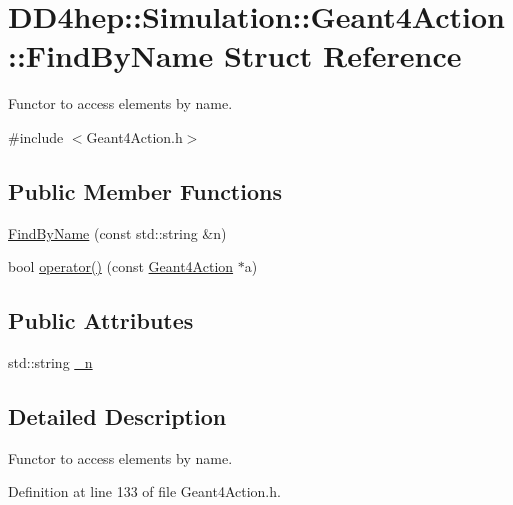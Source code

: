 \hypertarget{struct_d_d4hep_1_1_simulation_1_1_geant4_action_1_1_find_by_name}{
\section{DD4hep::Simulation::Geant4Action::FindByName Struct Reference}
\label{struct_d_d4hep_1_1_simulation_1_1_geant4_action_1_1_find_by_name}
}


Functor to access elements by name.  


{\ttfamily \#include $<$Geant4Action.h$>$}\subsection*{Public Member Functions}
\begin{DoxyCompactItemize}
\item 
\hyperlink{struct_d_d4hep_1_1_simulation_1_1_geant4_action_1_1_find_by_name_a731d979b2f54aaeb1f99d6c3723681d0}{FindByName} (const std::string \&n)
\item 
bool \hyperlink{struct_d_d4hep_1_1_simulation_1_1_geant4_action_1_1_find_by_name_add22afec2f12ebc3ead57df3694de5e5}{operator()} (const \hyperlink{class_d_d4hep_1_1_simulation_1_1_geant4_action}{Geant4Action} $\ast$a)
\end{DoxyCompactItemize}
\subsection*{Public Attributes}
\begin{DoxyCompactItemize}
\item 
std::string \hyperlink{struct_d_d4hep_1_1_simulation_1_1_geant4_action_1_1_find_by_name_ab2021d91a8c4487ef27bce6cb6d69966}{\_\-n}
\end{DoxyCompactItemize}


\subsection{Detailed Description}
Functor to access elements by name. 

Definition at line 133 of file Geant4Action.h.

